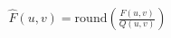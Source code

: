 \documentclass[preview]{standalone}
\begin{document}
\begin{align*}
\hat{F}(u,v) = \text{round}\!\left(\frac{F(u,v)}{Q(u,v)}\right)
\end{align*}
\end{document}

